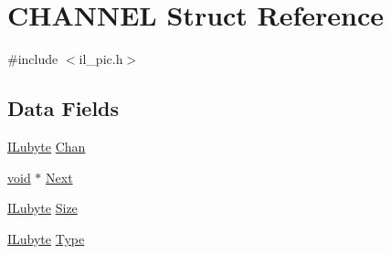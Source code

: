 \hypertarget{struct_c_h_a_n_n_e_l}{\section{C\-H\-A\-N\-N\-E\-L Struct Reference}
\label{struct_c_h_a_n_n_e_l}
}


{\ttfamily \#include $<$il\-\_\-pic.\-h$>$}

\subsection*{Data Fields}
\begin{DoxyCompactItemize}
\item 
\hyperlink{il_8h_a8d2f04500100a86d1b00e98ab1b15a33}{I\-Lubyte} \hyperlink{struct_c_h_a_n_n_e_l_ae44098b3d3a91bde7de7a361357d508a}{Chan}
\item 
\hyperlink{il_8h_a5530e04d947bcddd83639ea7940faf10}{void} $\ast$ \hyperlink{struct_c_h_a_n_n_e_l_a9c1fb6e887705cb28e8f5bdfa05d25f8}{Next}
\item 
\hyperlink{il_8h_a8d2f04500100a86d1b00e98ab1b15a33}{I\-Lubyte} \hyperlink{struct_c_h_a_n_n_e_l_ae8bccc7d768ed759ff64c0fc9c07591b}{Size}
\item 
\hyperlink{il_8h_a8d2f04500100a86d1b00e98ab1b15a33}{I\-Lubyte} \hyperlink{struct_c_h_a_n_n_e_l_a53459c6382c3de0c1ce53e9812531da6}{Type}
\end{DoxyCompactItemize}


